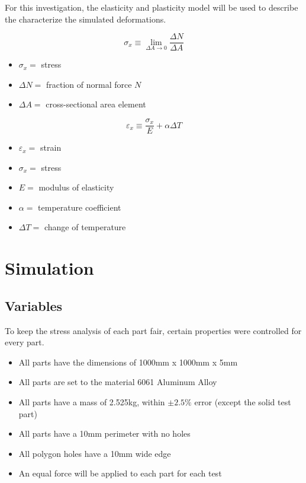 \documentclass[12pt, letterpaper]{article}
\begin{document}
For this investigation, the elasticity and plasticity model will be used to describe the characterize the simulated deformations. 

\begin{singlespace}
\begin{equation}
	\label{eq:stress}
	\sigma_x \equiv \lim_{\Delta A \rightarrow 0} \frac{\Delta N}{\Delta A}
\end{equation}
\begin{small}
\begin{itemize}
\item[] $\sigma_x =$ stress
\item[] $\Delta N =$ fraction of normal force $N$
\item[] $\Delta A =$ cross-sectional area element
\end{itemize}
\end{small}
\end{singlespace}


\begin{singlespace}
\begin{equation}
	\label{eq:strain}
	\varepsilon_x \equiv \frac{\sigma_x}{E} + \alpha \Delta T
\end{equation}
\begin{small}
\begin{itemize}
\item[] $\varepsilon_x =$ strain
\item[] $\sigma_x =$ stress
\item[] $E =$ modulus of elasticity
\item[] $\alpha =$ temperature coefficient
\item[] $\Delta T =$ change of temperature
\end{itemize}
\end{small}
\end{singlespace}

\section{Simulation}

\subsection{Variables}



To keep the stress analysis of each part fair, certain properties were controlled for every part. 

\begin{itemize}
\item All parts have the dimensions of 1000mm x 1000mm x 5mm
\item All parts are set to the material 6061 Aluminum Alloy
\item All parts have a mass of 2.525kg, within $\pm2.5\%$ error (except the solid test part)
\item All parts have a 10mm perimeter with no holes
\item All polygon holes have a 10mm wide edge
\item An equal force will be applied to each part for each test
\end{itemize}
\end{document}

